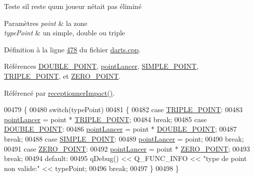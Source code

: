 Teste s\textquotesingle{}il reste qu\textquotesingle{}un joueur n\textquotesingle{}était pas éliminé 


\begin{DoxyParams}{Paramètres}
{\em point} & la zone \\
\hline
{\em type\+Point} & un simple, double ou triple \\
\hline
\end{DoxyParams}


Définition à la ligne \hyperlink{darts_8cpp_source_l00478}{478} du fichier \hyperlink{darts_8cpp_source}{darts.\+cpp}.



Références \hyperlink{darts_8h_source_l00019}{D\+O\+U\+B\+L\+E\+\_\+\+P\+O\+I\+NT}, \hyperlink{darts_8h_source_l00078}{point\+Lancer}, \hyperlink{darts_8h_source_l00020}{S\+I\+M\+P\+L\+E\+\_\+\+P\+O\+I\+NT}, \hyperlink{darts_8h_source_l00018}{T\+R\+I\+P\+L\+E\+\_\+\+P\+O\+I\+NT}, et \hyperlink{darts_8h_source_l00021}{Z\+E\+R\+O\+\_\+\+P\+O\+I\+NT}.



Référencé par \hyperlink{darts_8cpp_source_l00223}{receptionner\+Impact()}.


\begin{DoxyCode}
00479 \{
00480     \textcolor{keywordflow}{switch}(typePoint)
00481     \{
00482         \textcolor{keywordflow}{case} \hyperlink{darts_8h_a1bd6caead3e7edd423f064b3af34e486}{TRIPLE\_POINT}:
00483             \hyperlink{class_darts_a7ed0e6c9c07930603f85c2bac5b9d78b}{pointLancer} = point * \hyperlink{darts_8h_a1bd6caead3e7edd423f064b3af34e486}{TRIPLE\_POINT};
00484         \textcolor{keywordflow}{break};
00485         \textcolor{keywordflow}{case} \hyperlink{darts_8h_af67ad443603f4dddf225d062757614ca}{DOUBLE\_POINT}:
00486             \hyperlink{class_darts_a7ed0e6c9c07930603f85c2bac5b9d78b}{pointLancer} = point * \hyperlink{darts_8h_af67ad443603f4dddf225d062757614ca}{DOUBLE\_POINT};
00487         \textcolor{keywordflow}{break};
00488         \textcolor{keywordflow}{case} \hyperlink{darts_8h_a180cfdf433b8c9594f209d3c71c7c992}{SIMPLE\_POINT}:
00489             \hyperlink{class_darts_a7ed0e6c9c07930603f85c2bac5b9d78b}{pointLancer} = point;
00490         \textcolor{keywordflow}{break};
00491         \textcolor{keywordflow}{case}  \hyperlink{darts_8h_a02bea0ce22b1e13c5065f434182317fb}{ZERO\_POINT}:
00492             \hyperlink{class_darts_a7ed0e6c9c07930603f85c2bac5b9d78b}{pointLancer} = point * \hyperlink{darts_8h_a02bea0ce22b1e13c5065f434182317fb}{ZERO\_POINT};
00493         \textcolor{keywordflow}{break};
00494         \textcolor{keywordflow}{default}:
00495             qDebug() << Q\_FUNC\_INFO << \textcolor{stringliteral}{"type de point non valide:"} << typePoint;
00496         \textcolor{keywordflow}{break};
00497     \}
00498 \}
\end{DoxyCode}
\mbox{\label{class_darts_afeba952f29a901b4ebac86cfc7a4733f}} 
